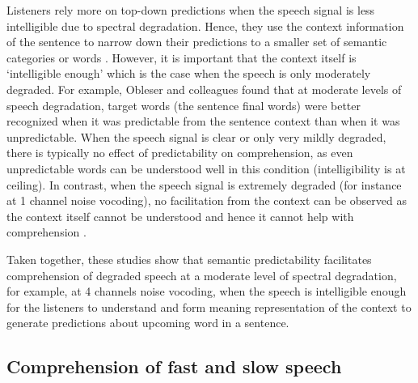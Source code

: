 \documentclass[a4paper, nobind]{templates/ociamthesis}
\begin{document}
Listeners rely more on top-down predictions when the speech signal is less intelligible due to spectral degradation.
Hence, they use the context information of the sentence to narrow down their predictions to a smaller set of semantic categories or words \autocites{Strauss2013}[see also,][]{Corps2020}.
However, it is important that the context itself is `intelligible enough' which is the case when the speech is only moderately degraded.
For example, Obleser and colleagues \autocite{Obleser2007,Obleser2010,Obleser2011} found that at moderate levels of speech degradation, target words (the sentence final words) were better recognized when it was predictable from the sentence context than when it was unpredictable.
When the speech signal is clear or only very mildly degraded, there is typically no effect of predictability on comprehension, as even unpredictable words can be understood well in this condition (intelligibility is at ceiling).
In contrast, when the speech signal is extremely degraded (for instance at 1 channel noise vocoding), no facilitation from the context can be observed as the context itself cannot be understood and hence it cannot help with comprehension \autocite{Obleser2010,Bhandari2021}.

Taken together, these studies show that semantic predictability facilitates comprehension of degraded speech at a moderate level of spectral degradation,
for example, at 4 channels noise vocoding,
when the speech is intelligible enough for the listeners to understand and form meaning representation of the context to generate predictions about upcoming word in a sentence.

\hypertarget{comprehension-of-fast-and-slow-speech}{%
\subsection{Comprehension of fast and slow speech}\label{comprehension-of-fast-and-slow-speech}}
\end{document}
